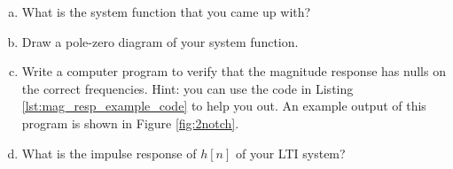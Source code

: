 \begin{enumerate}
\begin{enumerate}[a)] 
    \item What is the system function that you came up with?  
    \item Draw a pole-zero diagram of your system function.
    \item Write a computer program to verify that the magnitude response has nulls on the correct frequencies. Hint: you can use the code in Listing \ref{lst:mag_resp_example_code} to help you out. An example output of this program is shown in Figure \ref{fig:2notch}.  
    \item What is the impulse response of $h[n]$ of your LTI system?  
\end{enumerate}
\end{enumerate}

